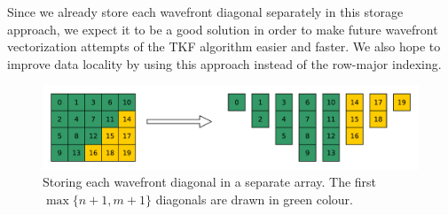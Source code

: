 \documentclass{article}
\begin{document}
Since we already store each wavefront diagonal separately in this storage approach, we expect it to be a good solution in order to make future wavefront vectorization attempts of the TKF algorithm easier and faster. We also hope to improve data locality by using this approach instead of the row-major indexing.

\begin{figure}[h!]

\centering
\includegraphics[scale=0.5]{images/bydiag.pdf}

\caption{Storing each wavefront diagonal in a separate array. The first $\max\{n+1,m+1\}$ diagonals are drawn in green colour.}
\label{fig:wavestruct}
\end{figure}




\end{document}
